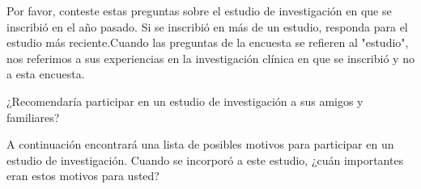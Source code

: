 \documentclass[spanish,pagemark,stamp,oneside,print_questionnaire_id]{sdapsclassic}
\begin{document}
\begin{questionnaire}
\begin{Form}
\begin{info}
                            Por favor, conteste estas preguntas sobre el estudio de investigación en que se inscribió en el año pasado.  Si se inscribió en más de un estudio, responda para el estudio más reciente.Cuando las preguntas de la encuesta se refieren al "estudio", nos referimos a sus experiencias en la investigación clínica en que se inscribió y no a esta encuesta.
                        \end{info}
                        \begin{optionquestion}[singlechoice,cols=1]{¿Recomendaría participar en un estudio de investigación a sus amigos y familiares?}\end{optionquestion}
                           \begin{optiongroup}{A continuación encontrará una lista de posibles motivos para participar en un estudio de investigación. Cuando se incorporó a este estudio, ¿cuán importantes eran estos motivos para usted?}
                        
                            
                            
                            
                            
                    
                    
                    
                    
                    
                    
                    

\end{optiongroup}
\end{Form}
\end{questionnaire}
\end{document}
